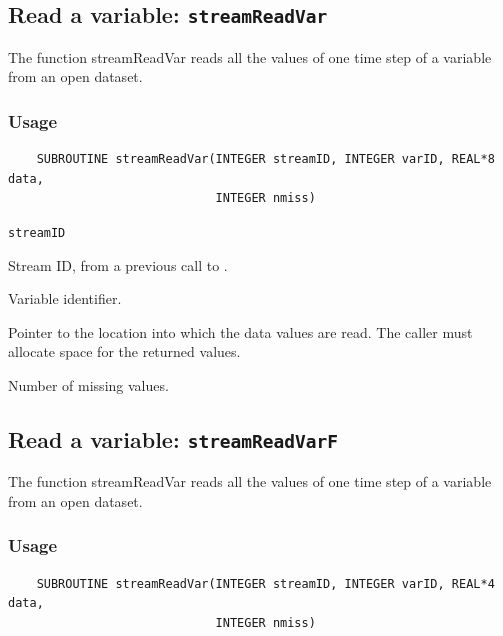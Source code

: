 

\subsection{Read a variable: {\tt streamReadVar}}
\label{streamReadVar}

The function streamReadVar reads all the values of one time step of a variable
from an open dataset.
\subsubsection*{Usage}

\begin{verbatim}
    SUBROUTINE streamReadVar(INTEGER streamID, INTEGER varID, REAL*8 data, 
                             INTEGER nmiss)
\end{verbatim}

\hspace*{4mm}\begin{minipage}[]{15cm}
\begin{deflist}{\tt streamID\ }
\item[{\tt streamID}]
Stream ID, from a previous call to {}.
\item[{\tt varID}]
Variable identifier.
\item[{\tt data}]
Pointer to the location into which the data values are read.
                     The caller must allocate space for the returned values.
\item[{\tt nmiss}]
Number of missing values.

\end{deflist}
\end{minipage}


\subsection{Read a variable: {\tt streamReadVarF}}
\label{streamReadVarF}

The function streamReadVar reads all the values of one time step of a variable
from an open dataset.
\subsubsection*{Usage}

\begin{verbatim}
    SUBROUTINE streamReadVar(INTEGER streamID, INTEGER varID, REAL*4 data, 
                             INTEGER nmiss)
\end{verbatim}

